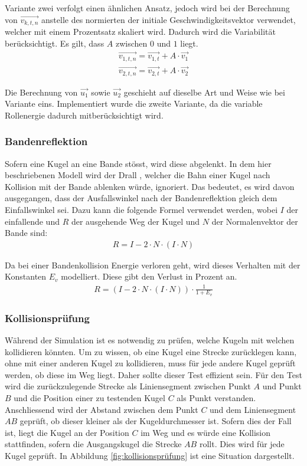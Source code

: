 Variante zwei verfolgt einen ähnlichen Ansatz, jedoch wird bei der Berechnung von $\vec{v_{k,t,n}}$ anstelle des normierten
der initiale Geschwindigkeitsvektor verwendet, welcher mit einem Prozentsatz skaliert wird. Dadurch wird die Variabilität
berücksichtigt. Es gilt, dass $A$ zwischen $0$ und $1$ liegt.
\begin{align}
    \vec{v_{1,t,n}} = \vec{v_{1,t}} + A \cdot \vec{v_1}\\
    \vec{v_{2,t,n}} = \vec{v_{2,t}} + A \cdot \vec{v_2}
\end{align}

Die Berechnung von $\vec{u_1}$ sowie $\vec{u_2}$ geschieht auf dieselbe Art und Weise wie bei Variante eins.
Implementiert wurde die zweite Variante, da die variable Rollenergie dadurch mitberücksichtigt wird.

\newpage
\subsubsection{Bandenreflektion}
Sofern eine Kugel an eine Bande stösst, wird diese abgelenkt. In dem hier beschriebenen Modell wird der Drall \cite{wiki.spin:1},
welcher die Bahn einer Kugel nach Kollision mit der Bande ablenken würde, ignoriert.
Das bedeutet, es wird davon ausgegangen, dass der Ausfallswinkel nach der Bandenreflektion gleich dem Einfallswinkel sei.
Dazu kann die folgende Formel \cite{paulbourke.reflected_ray:1} verwendet werden, wobei $I$ der einfallende
und $R$ der ausgehende Weg der Kugel und $N$ der Normalenvektor der Bande sind:
\begin{align}
    R = I - 2 \cdot N \cdot (I \cdot N)
\end{align}

Da bei einer Bandenkollision Energie verloren geht, wird dieses Verhalten mit der Konstanten $E_v$ modelliert.
Diese gibt den Verlust in Prozent an.
\begin{align}
    R = (I - 2 \cdot N \cdot (I \cdot N)) \cdot \frac{1}{1 + E_v}
\end{align}

\subsubsection{Kollisionsprüfung}
Während der Simulation ist es notwendig zu prüfen, welche Kugeln mit welchen kollidieren könnten.
Um zu wissen, ob eine Kugel eine Strecke zurücklegen kann, ohne mit einer anderen Kugel zu kollidieren,
muss für jede andere Kugel geprüft werden, ob diese im Weg liegt.
Daher sollte dieser Test effizient sein.
Für den Test wird die zurückzulegende Strecke als Liniensegment zwischen Punkt $A$ und Punkt $B$ und die Position
einer zu testenden Kugel $C$ als Punkt verstanden. Anschliessend wird der Abstand zwischen dem Punkt $C$ und dem
Liniensegment $AB$ geprüft, ob dieser kleiner als der Kugeldurchmesser ist.
Sofern dies der Fall ist, liegt die Kugel an der Position $C$ im Weg und es würde eine Kollision stattfinden,
sofern die Ausgangskugel die Strecke $AB$ rollt.
Dies wird für jede Kugel geprüft.
In Abbildung \ref{fig:kollisionsprüfung} ist eine Situation dargestellt.

